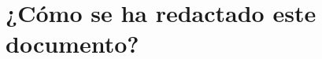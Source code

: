 \documentclass{subfiles}
\begin{document}
  \chapter{¿Cómo se ha redactado este documento?}
\end{document}
